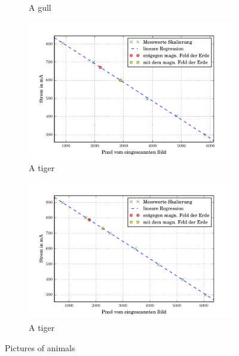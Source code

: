 \begin{figure}
\begin{subfigure}[b]{0.49\textwidth}
     \caption{A gull}
     \label{fig:gull}
  \end{subfigure}
  \begin{subfigure}[b]{0.49\textwidth}
     \includegraphics[width=\textwidth]{picture/25MHz.pdf}
     \caption{A tiger}
     \label{fig:tiger}
  \end{subfigure}
  \begin{subfigure}[b]{0.49\textwidth}
     \includegraphics[width=\textwidth]{picture/30MHz.pdf}
     \caption{A tiger}
     \label{fig:tiger}
  \end{subfigure}
  \caption{Pictures of animals}\label{fig:animals}
\end{figure}
